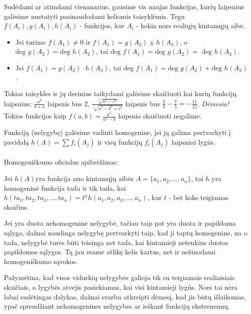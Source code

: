 Sudėdami ar atimdami vienanarius, gausime vis naujas funkcijas, kurių laipsnius
galėsime nustatyti pasinaudodami keliomis taisyklėmis. Tegu $f(A_{i}), g(A_{i}), h(A_{i})$ -
funkcijos, kur $A_{i}$ - kokia nors realiųjų kintamųjų aibė.

\begin{itemize}
\item Jei turime $f(A_{1})\neq 0$ ir $f(A_{1})=g(A_{2}) \pm h(A_{3})$, o
	$\text{deg } g(A_{2}) = \text{deg } h(A_{2})$, tai $\text{deg }f(A_{1})=\text{deg }g(A_{2})=\text{ deg }h(A_{3})$.
\item Jei $f(A_{1})=g(A_{2})\cdot h(A_{3})$, tai $\text{deg }f(A_{1}) = \text{deg } g(A_{2})+\text{deg }h(A_{3})$.
\end{itemize}
\begin{pav} Tokias taisykles ir jų derinius taikydami galėsime skaičiuoti
kai kurių funkcijų laipsnius: $\frac{a^3}{b+a}$	laipsnis bus 2, $\frac{\sqrt[3]{a^2-c^2}}{\sqrt[5]{a^7-b^7+c^7}}$
laipsnis bus $\frac{2}{3}-\frac{7}{5}=-\frac{11}{15}$. \textit{Dėmesio!}
Tokios funkcijos kaip $f(a,b)=\frac{a^3}{a^2-b}$ laipsnio skaičiuoti negalime.
\end{pav}

Funkciją (nelygybę) galėsime vadinti homogenine, jei ją galima pertvarkyti
į pavidalą $h(A)=\sum{f_{i}(A_{j})}$ ir visų funkcijų $f_{i}(A_{j})$
laipsniai lygūs.
\\
\\ \indent Homogeniškumo oficialus apibrėžimas:
\begin{api}
Jei $h(A)$yra funkcija nuo kintamųjų aibės $A=\{a_1,a_2,\ldots,a_n\}$, tai
$h$ yra homogeninė funkcija tada ir tik tada, kai
$h(ta_{1},ta_{2},ta_{3},...,ta_{n})=t^n h(a_{1},a_{2},a_{3},...,a_{n})$,
kur $t$ - bet koks teigiamas skaičius. \end{api}

Jei yra duota nehomogeninė nelygybė, tačiau taip pat yra duota ir papildoma
sąlyga, dažnai naudinga nelygybę pertvarkyti taip, kad ji taptų
homogenine, na o tada, nelygybė turės būti teisinga net tada, kai
kintamieji netenkins duotos papildomos sąlygos. Tą jau esame atlikę kelis
kartus, net ir nežinodami homogeniškumo sąvokos.

Pažymėtina, kad visos vidurkių nelygybės galioja tik su teigiamais
realiaisiais skaičiais, o lygybės atvejis pasiekiamas, kai visi kintamieji
lygūs. Nors tai nėra labai sudėtingas dalykas, dažnai svarbu atkreipti
dėmesį, kad jis būtų išlaikomas, ypač sprendžiant nehomogenines nelygybes
ar ieškant funkcijų ekstremumų.

